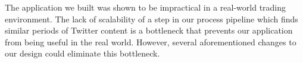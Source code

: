 \documentclass[twocolumn]{article}
\begin{document}
The application we built was shown to be impractical in a real-world trading environment. The lack of scalability of a step in our process pipeline which finds similar periods of Twitter content is a bottleneck that prevents our application from being useful in the real world. However, several aforementioned changes to our design could eliminate this bottleneck.



\end{document}
